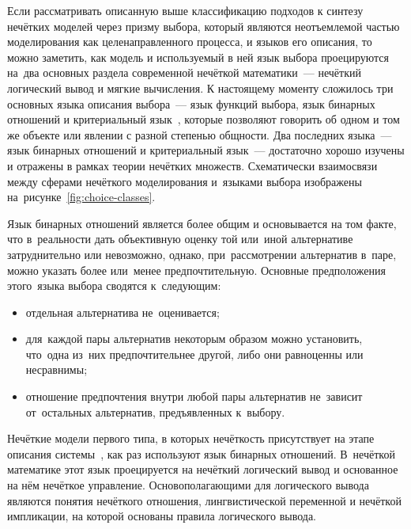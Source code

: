 Если рассматривать описанную выше классификацию подходов к синтезу нечётких моделей через призму выбора, который являются неотъемлемой частью моделирования как целенаправленного процесса, и языков его описания, то можно заметить, как модель и используемый в ней язык выбора проецируются на~два основных раздела современной нечёткой математики~--- нечёткий логический вывод и мягкие вычисления. К настоящему моменту сложилось три основных языка описания выбора~--- язык функций выбора, язык бинарных отношений и критериальный язык~\cite{Choice_Languages}, которые позволяют говорить об одном и том же объекте или явлении с разной степенью общности. Два последних языка~--- язык бинарных отношений и критериальный язык~--- достаточно хорошо изучены и отражены в рамках теории нечётких множеств. Схематически взаимосвязи между сферами нечёткого моделирования и~языками выбора изображены на~рисунке~\ref{fig:choice-classes}.

\begin{figure}[t!]
\end{figure}

Язык бинарных отношений является более общим и основывается на том факте, что в~реальности дать объективную оценку той или~иной альтернативе затруднительно или невозможно, однако, при~рассмотрении альтернатив в~паре, можно указать более или~менее предпочтительную. Основные предположения этого~языка выбора сводятся к~следующим:
\begin{itemize}
	\item отдельная альтернатива не~оценивается;
	\item для~каждой пары альтернатив некоторым образом можно установить, что~одна из~них предпочтительнее другой, либо они равноценны или несравнимы;
	\item отношение предпочтения внутри любой пары альтернатив не~зависит от~остальных альтернатив, предъявленных к~выбору.
\end{itemize}

Нечёткие модели первого типа, в которых нечёткость присутствует на этапе описания системы~\cite{Choice_Languages}, как раз используют язык бинарных отношений. В~нечёткой математике этот язык проецируется на нечёткий логический вывод и основанное на нём нечёткое управление. Основополагающими для логического вывода являются понятия нечёткого отношения, лингвистической переменной и нечёткой импликации, на которой основаны правила логического вывода.

